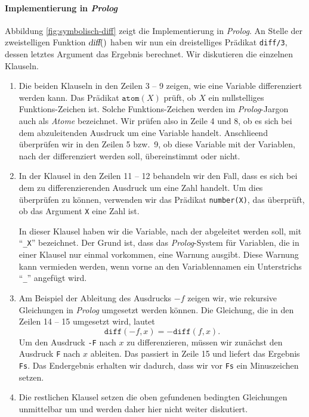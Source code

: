 \paragraph{Implementierung in \textsl{Prolog}}
Abbildung \ref{fig:symbolisch-diff} zeigt die Implementierung in \textsl{Prolog}.
An Stelle der zweistelligen Funktion $\textsl{diff}()$ haben wir nun ein dreistelliges Pr\"{a}dikat 
\texttt{diff/3}, dessen letztes Argument das Ergebnis berechnet.
Wir diskutieren die einzelnen Klauseln.
\begin{enumerate}
\item Die beiden Klauseln in den Zeilen 3 -- 9 zeigen, wie eine Variable differenziert werden kann.
      Das Pr\"{a}dikat $\texttt{atom}(X)$ pr\"{u}ft, ob $X$ ein nullstelliges Funktions-Zeichen ist.
      Solche Funktions-Zeichen werden im \textsl{Prolog}-Jargon auch als \emph{Atome} bezeichnet.
      Wir pr\"{u}fen also in Zeile 4 und 8, ob es sich bei dem abzuleitenden Ausdruck um eine Variable
      handelt.  Anschlie\3end \"{u}berpr\"{u}fen wir in den Zeilen 5 bzw.~9, ob diese Variable mit der
      Variablen, nach der differenziert werden soll, \"{u}bereinstimmt oder nicht.

      
\item In der Klausel in den Zeilen 11 -- 12 behandeln wir den Fall, dass es sich bei dem zu
      differenzierenden Ausdruck um eine Zahl handelt.  Um dies \"{u}berpr\"{u}fen zu k\"{o}nnen, verwenden wir
      das Pr\"{a}dikat \texttt{number(X)}, das \"{u}berpr\"{u}ft, ob das Argument \texttt{X}  eine Zahl ist.
      
      In dieser Klausel haben wir die Variable, nach der abgeleitet werden soll, mit
      ``\texttt{\_X}'' bezeichnet.  Der Grund ist, dass das \textsl{Prolog}-System f\"{u}r Variablen, 
      die in einer Klausel nur einmal vorkommen, eine Warnung ausgibt.  Diese Warnung kann vermieden
      werden, wenn vorne an den Variablennamen  ein Unterstrichs ``\texttt{\_}'' angef\"{u}gt wird.
\item Am Beispiel der Ableitung des Ausdrucks $-f$ zeigen wir, wie rekursive Gleichungen
      in \textsl{Prolog} umgesetzt werden k\"{o}nnen. Die Gleichung, die in den Zeilen 14 --
      15 umgesetzt wird, lautet
      \[ \texttt{diff}(-f,x) = - \texttt{diff}(f,x). \]
      Um den Ausdruck \texttt{-F} nach $x$ zu differenzieren, m\"{u}ssen wir zun\"{a}chst den
      Ausdruck \texttt{F} nach $x$ ableiten.  Das passiert in 
      Zeile 15 und liefert das Ergebnis \texttt{Fs}.  Das Endergebnis erhalten wir dadurch, dass
      wir vor \texttt{Fs} ein Minuszeichen setzen.
\item Die restlichen Klausel setzen die oben gefundenen bedingten Gleichungen unmittelbar um und
      werden daher hier nicht weiter diskutiert.
\end{enumerate}

